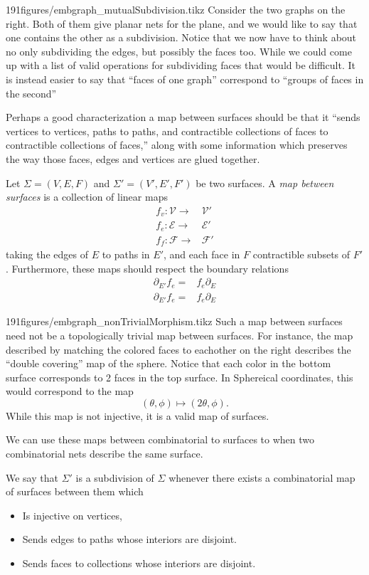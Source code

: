 \begin{examplefigureenv}{191figures/embgraph_mutualSubdivision.tikz}
	Consider the two graphs on the right. Both of them give planar nets for the plane, and we would like to say that one contains the other as a subdivision. Notice that we now have to think about no only subdividing the edges, but possibly the faces too. While we could come up with a list of valid operations for subdividing faces that would be difficult. It is instead easier to say that ``faces of one graph'' correspond to ``groups of faces in the second''
\end{examplefigureenv}
Perhaps a good characterization a map between surfaces should be that it ``sends vertices to vertices, paths to paths, and contractible collections of faces to contractible collections of faces,'' along with some information which preserves the way those faces, edges and vertices are glued together. 
\begin{definition}
Let $\Sigma= (V, E, F)$ and $\Sigma'=(V', E', F')$ be two surfaces. A \emph{map between surfaces} is a collection of linear maps
\begin{align*}
f_v:\mathcal V\to &\mathcal V'\\
f_e:\mathcal E\to &\mathcal E'\\
f_f:\mathcal F\to &\mathcal F'
\end{align*}
taking the edges of $E$ to paths in $E'$, and each face in $F$ contractible subsets of $F'$. Furthermore, these maps should respect the boundary relations 
\begin{align*}
\partial_{E'} f_e = &f_e \partial_{E}\\
\partial_{E'} f_e = &f_e \partial_{E}
\end{align*}
\end{definition}


\begin{examplefigureenv}{191figures/embgraph_nonTrivialMorphism.tikz}
	Such a map between surfaces need not be a topologically trivial map between surfaces. For instance, the map described by matching the colored faces to eachother on the right describes the ``double covering'' map of the sphere. Notice that each color in the bottom surface corresponds to 2 faces in the top surface. In Sphereical coordinates, this would correspond to the map 
\[(\theta, \phi)\mapsto (2\theta, \phi).\]
While this map is not injective, it is a valid map of surfaces. 
\end{examplefigureenv}
We can use these maps between combinatorial to surfaces to when two combinatorial nets describe the same surface. 
\begin{definition}
We say that $\Sigma'$ is a subdivision of $\Sigma$ whenever there exists a combinatorial map of surfaces between them which 
\begin{itemize}
\item Is injective on vertices, 
\item Sends edges to paths whose interiors are disjoint.
\item Sends faces to collections whose interiors are disjoint. 
\end{itemize}
\end{definition}

